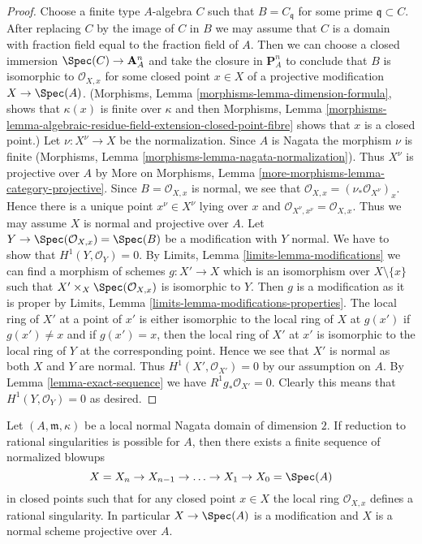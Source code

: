 \begin{proof}
Choose a finite type $A$-algebra $C$ such that $B = C_\mathfrak q$
for some prime $\mathfrak q \subset C$. After replacing
$C$ by the image of $C$ in $B$ we may assume that $C$ is a domain
with fraction field equal to the fraction field of $A$.
Then we can choose a closed immersion $\Spec(C) \to \mathbf{A}^n_A$
and take the closure in $\mathbf{P}^n_A$ to conclude that $B$
is isomorphic to $\mathcal{O}_{X, x}$ for some closed point $x \in X$
of a projective modification $X \to \Spec(A)$.
(Morphisms, Lemma \ref{morphisms-lemma-dimension-formula},
shows that $\kappa(x)$ is finite over $\kappa$ and then
Morphisms, Lemma
\ref{morphisms-lemma-algebraic-residue-field-extension-closed-point-fibre}
shows that $x$ is a closed point.)
Let $\nu : X^\nu \to X$ be the normalization.
Since $A$ is Nagata the morphism $\nu$ is finite (Morphisms, Lemma
\ref{morphisms-lemma-nagata-normalization}).
Thus $X^\nu$ is projective over $A$ by
More on Morphisms, Lemma
\ref{more-morphisms-lemma-category-projective}.
Since $B = \mathcal{O}_{X, x}$ is normal, we see that
$\mathcal{O}_{X, x} = (\nu_*\mathcal{O}_{X^\nu})_x$.
Hence there is a unique point $x^\nu \in X^\nu$ lying over $x$
and $\mathcal{O}_{X^\nu, x^\nu} = \mathcal{O}_{X, x}$.
Thus we may assume $X$ is normal and projective over $A$.
Let $Y \to \Spec(\mathcal{O}_{X, x}) = \Spec(B)$
be a modification with $Y$ normal.
We have to show that $H^1(Y, \mathcal{O}_Y) = 0$. By
Limits, Lemma \ref{limits-lemma-modifications}
we can find a morphism of schemes $g : X' \to X$ which is an isomorphism
over $X \setminus \{x\}$ such that $X' \times_X \Spec(\mathcal{O}_{X, x})$
is isomorphic to $Y$. Then $g$ is a modification as it is proper by
Limits, Lemma \ref{limits-lemma-modifications-properties}.
The local ring of $X'$ at a point of $x'$ is either isomorphic
to the local ring of $X$ at $g(x')$ if $g(x') \not = x$ and
if $g(x') = x$, then the local ring of $X'$ at $x'$ is isomorphic
to the local ring of $Y$ at the corresponding point. Hence we see
that $X'$ is normal as both $X$ and $Y$ are normal.
Thus $H^1(X', \mathcal{O}_{X'}) = 0$ by our assumption on $A$.
By Lemma \ref{lemma-exact-sequence} we have $R^1g_*\mathcal{O}_{X'} = 0$.
Clearly this means that $H^1(Y, \mathcal{O}_Y) = 0$ as desired.
\end{proof}

\begin{lemma}
\label{lemma-reduce-to-rational}
Let $(A, \mathfrak m, \kappa)$ be a local normal Nagata domain
of dimension $2$. If reduction to rational singularities is possible
for $A$, then there exists a finite sequence of normalized blowups
$$
X = X_n \to X_{n - 1} \to \ldots \to X_1 \to X_0 = \Spec(A)
$$
in closed points such that for any closed point $x \in X$
the local ring $\mathcal{O}_{X, x}$ defines a rational singularity.
In particular $X \to \Spec(A)$ is a modification and $X$
is a normal scheme projective over $A$.
\end{lemma}

